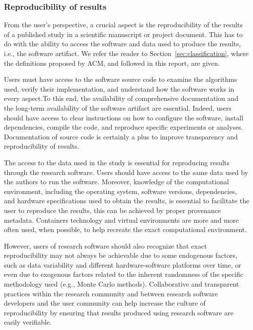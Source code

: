 \subsubsection*{Reproducibility of results}
\label{sec:user_repro_results}

From the user's perspective, a crucial aspect is the reproducibility of the results of a published study in a scientific manuscript or project document. This has to do with the ability to access the software and data used to produce the results, i.e., the software artifact. We refer the reader to Section~\ref{sec:classification}, where the definitions proposed by ACM, and followed in this report, are given.


Users must have access to the software source code to examine the algorithms used, verify their implementation, and understand how the software works in every aspect.To this end, the availability of comprehensive documentation and the long-term availability of the software artifact are essential. Indeed, users should have access to clear instructions on how to configure the software, install dependencies, compile the code, and reproduce specific experiments or analyses. Documentation of source code is certainly a plus to improve transparency and reproducibility of results.

The access to the data used in the study is essential for reproducing results through the research software. Users should have access to the same data used by the authors to run the software. Moreover, knowledge of the computational environment, including the operating system, software versions, dependencies, and hardware specifications used to obtain the results, is essential to facilitate the user to reproduce the results, this can be achieved by proper provenance metadata. Containers technology and virtual environments are more and more often used, when possible, to help recreate the exact computational environment.

However, users of research software should also recognize that exact reproducibility may not always be achievable due to some endogenous factors, such as data variability and different hardware-software platforms over time, or even due to exogenous factors related to the inherent randomness of the specific methodology used (e.g., Monte Carlo methods). Collaborative and transparent practices within the research community and between research software developers and the user community can help increase the culture of reproducibility by ensuring that results produced using research software are easily verifiable.

